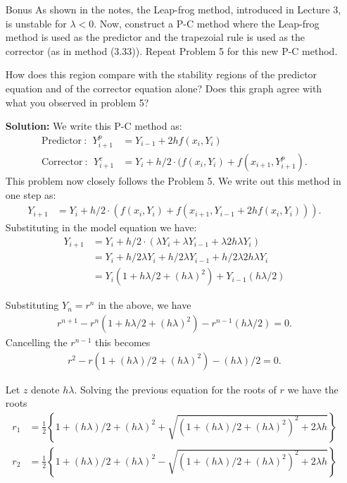 \documentclass[11pt]{article}
\begin{document}
\begin{enumerate}
\clearpage
\newpage
\item[Bonus] As shown in the notes, the Leap-frog method, introduced in Lecture 3, is unstable for $\lambda < 0$.
Now, construct a P-C method where the Leap-frog method is used as the predictor and the trapezoial rule is used as the corrector (as in method (3.33)).
Repeat Problem 5 for this new P-C method.

How does this region compare with the stability regions of the predictor equation and of the corrector equation alone?
Does this graph agree with what you observed in problem 5?

\textbf{Solution:} We write this P-C method as:
\begin{align} \text{Predictor}~:~~ Y_{i+1} ^p & = Y_{i-1} + 2hf(x_i,Y_i) \\
  \text{Corrector}~:~~ Y_{i+1} ^c & = Y_i + h/2 \cdot ( f(x_i,Y_i) + f(x_{i+1},Y^p_{i+1} ) .\end{align}
This problem now closely follows the Problem 5.
We write out this method in one step as:
\begin{align} Y_{i+1} & = Y_i + h/2 \cdot ( f(x_i,Y_i) + f(x_{i+1},Y_{i-1} + 2hf(x_i,Y_i) ) ).\end{align}
Substituting in the model equation we have:
\begin{align} Y_{i+1} & = Y_i + h/2 \cdot ( \lambda Y_i + \lambda Y_{i-1} + \lambda 2h \lambda Y_i ) \\
& = Y_i + h/2 \lambda Y_i + h/2 \lambda Y_{i-1} + h/2 \lambda 2h \lambda Y_i \\
& = Y_i (1 + h\lambda /2  + (h\lambda)^2 ) + Y_{i-1} (h\lambda /2) \end{align}

Substituting $Y_n = r^n$ in the above, we have
\begin{align} r^{n+1} - r^n (1 + h\lambda /2  + (h\lambda)^2 ) - r^{n-1} (h\lambda /2) = 0.\end{align}
Cancelling the $r^{n-1}$ this becomes
\begin{align} r^{2} - r (1 + (h\lambda) /2  + (h\lambda)^2 ) - (h\lambda) /2 = 0.\end{align}

Let $z$ denote $h\lambda$.
Solving the previous equation for the roots of $r$ we have the roots
\begin{align} r_1 &= \frac{1}{2} \left \{ 1 + (h\lambda) /2  + (h\lambda)^2 + \sqrt{\left( 1 + (h\lambda) /2  + (h\lambda)^2 \right ) ^2 + 2 \lambda h } \right \} \\
r_2 &= \frac{1}{2} \left \{ 1 + (h\lambda) /2  + (h\lambda)^2 - \sqrt{\left( 1 + (h\lambda) /2  + (h\lambda)^2 \right ) ^2 + 2 \lambda h } \right \} \end{align}


\end{enumerate}
\end{document}
